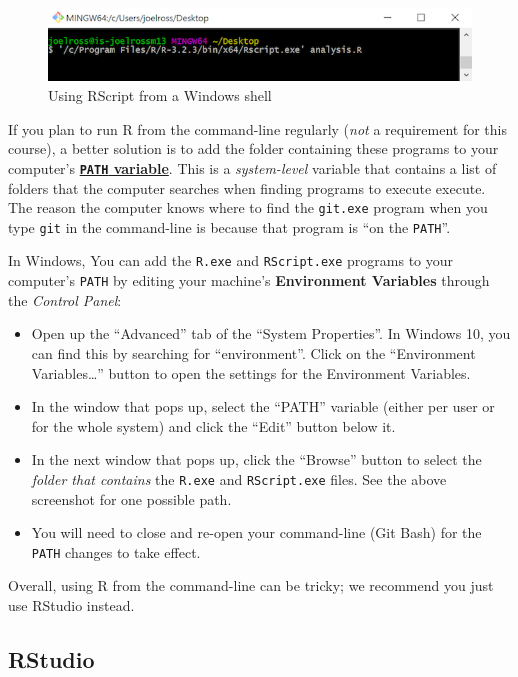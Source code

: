 \documentclass[]{book}
\theoremstyle{definition}
\theoremstyle{definition}
\theoremstyle{remark}
\begin{document}
\begin{figure}
\centering
\includegraphics{img/r-intro/rscript-terminal-windows.png}
\caption{Using RScript from a Windows shell}
\end{figure}

If you plan to run R from the command-line regularly (\emph{not} a
requirement for this course), a better solution is to add the folder
containing these programs to your computer's
\href{https://en.wikipedia.org/wiki/PATH_(variable)}{\textbf{\texttt{PATH}
variable}}. This is a \emph{system-level} variable that contains a list
of folders that the computer searches when finding programs to execute
execute. The reason the computer knows where to find the
\texttt{git.exe} program when you type \texttt{git} in the command-line
is because that program is ``on the \texttt{PATH}''.

In Windows, You can add the \texttt{R.exe} and \texttt{RScript.exe}
programs to your computer's \texttt{PATH} by editing your machine's
\textbf{Environment Variables} through the \emph{Control Panel}:

\begin{itemize}
\item
  Open up the ``Advanced'' tab of the ``System Properties''. In Windows
  10, you can find this by searching for ``environment''. Click on the
  ``Environment Variables\ldots{}'' button to open the settings for the
  Environment Variables.
\item
  In the window that pops up, select the ``PATH'' variable (either per
  user or for the whole system) and click the ``Edit'' button below it.
\item
  In the next window that pops up, click the ``Browse'' button to select
  the \emph{folder that contains} the \texttt{R.exe} and
  \texttt{RScript.exe} files. See the above screenshot for one possible
  path.
\item
  You will need to close and re-open your command-line (Git Bash) for
  the \texttt{PATH} changes to take effect.
\end{itemize}

Overall, using R from the command-line can be tricky; we recommend you
just use RStudio instead.

\subsection{RStudio}\label{rstudio-1}
\end{document}
